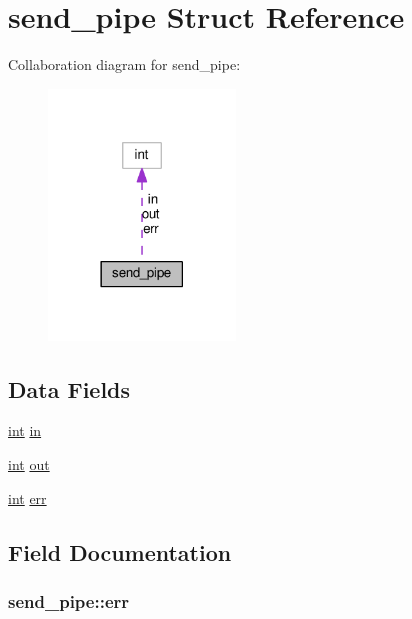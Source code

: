 \hypertarget{structsend__pipe}{}\section{send\+\_\+pipe Struct Reference}
\label{structsend__pipe}


Collaboration diagram for send\+\_\+pipe\+:
\nopagebreak
\begin{figure}[H]
\begin{center}
\leavevmode
\includegraphics[width=141pt]{structsend__pipe__coll__graph}
\end{center}
\end{figure}
\subsection*{Data Fields}
\begin{DoxyCompactItemize}
\item 
\hyperlink{pcre_8txt_a42dfa4ff673c82d8efe7144098fbc198}{int} \hyperlink{structsend__pipe_ad04caf8393a3dcf84838cae162d222a0}{in}
\item 
\hyperlink{pcre_8txt_a42dfa4ff673c82d8efe7144098fbc198}{int} \hyperlink{structsend__pipe_ad15364f71a171d67455512b7219e6e92}{out}
\item 
\hyperlink{pcre_8txt_a42dfa4ff673c82d8efe7144098fbc198}{int} \hyperlink{structsend__pipe_a0434efafc574bf4f7d69391f62008248}{err}
\end{DoxyCompactItemize}


\subsection{Field Documentation}
\subsubsection[{\texorpdfstring{err}{err}}]{ send\+\_\+pipe\+::err}\hypertarget{structsend__pipe_a0434efafc574bf4f7d69391f62008248}{}\label{structsend__pipe_a0434efafc574bf4f7d69391f62008248}
